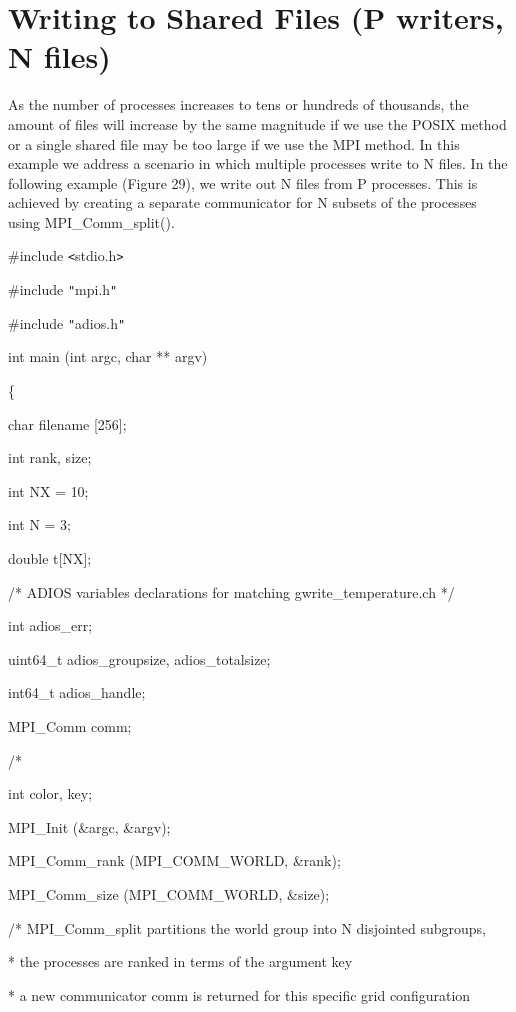 \section{Writing to Shared Files (P writers, N files)}

\leftskip=0pt
As the number of processes increases to tens or hundreds of thousands, the amount 
of files will increase by the same magnitude if we use the POSIX method or a single 
shared file may be too large if we use the MPI method. In this example we address 
a scenario in which multiple processes write to N files. In the following example 
(Figure 29), we write out N files from P processes. This is achieved by creating 
a separate communicator for N subsets of the processes using MPI\_Comm\_split(). 

\#include \texttt{<}stdio.h\texttt{>}

\#include \texttt{"}mpi.h\texttt{"}

\#include \texttt{"}adios.h\texttt{"}

int main (int argc, char ** argv) 

\{

\leftskip=18pt
char      \textbf{    } filename [256];

int              rank, size;

int              NX\textbf{ }=\textbf{ }10; 

{\color{color02} int              N = 3;}

double      t[NX];

/* ADIOS variables declarations for matching gwrite\_temperature.ch */

int        \textbf{         }adios\_err;

uint64\_t      adios\_groupsize, adios\_totalsize;

int64\_t     adios\_handle;

MPI\_Comm comm;

/* 

int              color, key;

MPI\_Init (\&argc, \&argv);

MPI\_Comm\_rank (MPI\_COMM\_WORLD, \&rank);

MPI\_Comm\_size (MPI\_COMM\_WORLD, \&size);

/* MPI\_Comm\_split partitions the world group into N disjointed  subgroups, 

\parindent=7pt
* the processes are ranked in terms of the argument key  

*  a new communicator comm is returned for this specific grid configuration

